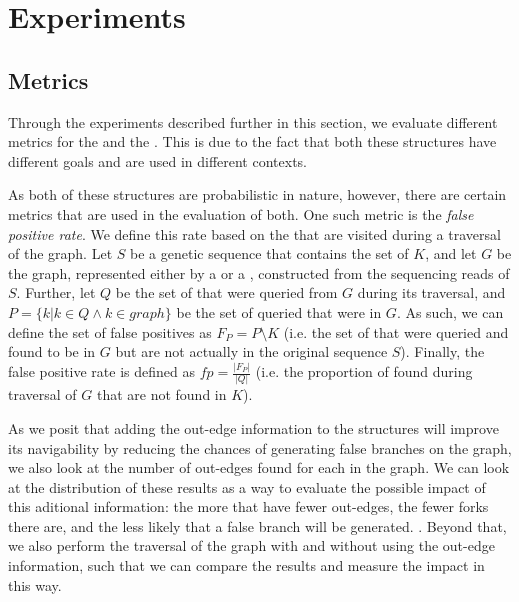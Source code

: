\section{Experiments}

\subsection{Metrics}

Through the experiments described further in this section, we evaluate different metrics for the \dBCM and the \dBHT. This is due to
the fact that both these structures have different goals and are used in different contexts.

As both of these structures are probabilistic in nature, however, there are certain metrics that are used in the evaluation of both.
One such metric is the \emph{false positive rate}. We define this rate based on the \kmers that are visited during a 
traversal of the graph. Let $S$ be a genetic sequence that contains the set of \kmers $K$, and let $G$ be the graph, represented
either by a \dBCM or a \dBHT, constructed from the sequencing reads of $S$. Further, let $Q$ be the set of \kmers that were queried
from $G$ during its traversal, and $P=\{k | k \in Q \wedge k \in graph\}$ be the set of queried \kmers that were in $G$. As such, we can
define the set of false positives as $F_P=P \setminus K$ (i.e. the set of \kmers that were queried and found to be in $G$ but are not
actually in the original sequence $S$). Finally, the false positive rate is defined as $\mathit{fp}=\frac{|F_P|}{|Q|}$ (i.e. the
proportion of \kmers found during traversal of $G$ that are not found in $K$).


As we posit that adding the out-edge information to the structures will improve its navigability by reducing the chances of generating
false branches on the graph, we also look at the number of out-edges found for each \kmer in the graph. We can look at the distribution
of these results as a way to evaluate the possible impact of this aditional information: the more \kmers that have fewer out-edges,
the fewer forks there are, and the less likely that a false branch will be generated. . Beyond that, we also perform the traversal of the graph with and
without using the out-edge information, such that we can compare the results and measure the impact in this way.

